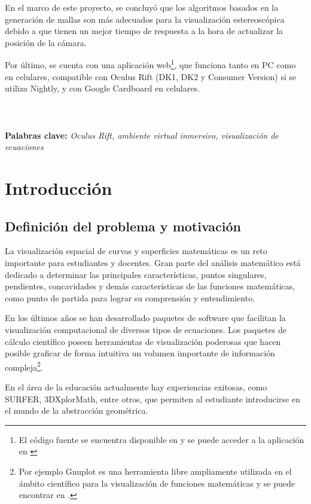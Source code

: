 \documentclass[12pt]{article}
\begin{document}
En el marco de este proyecto, se concluyó que los algoritmos basados en la generación de mallas son más adecuados para la visualización estereoscópica debido a que tienen un mejor tiempo de respuesta a la hora de actualizar la posición de la cámara.

Por último, se cuenta con una aplicación web\footnote{El código fuente se encuentra disponible en \cite{nuestrocodigo} y se puede acceder a la aplicación en \cite{nuestrositio}}, que funciona  tanto en PC como en celulares,  compatible con Oculus Rift (DK1, DK2 y Consumer Version) si se utiliza Nightly, y con Google Cardboard en celulares.
\\
\\
\\
\\
\textbf{Palabras clave:} \textit{Oculus Rift, ambiente virtual inmersivo, visualización de ecuaciones} 


\clearpage
\tableofcontents
\clearpage
\section{Introducción}

\subsection{Definición del problema y motivación}
\noindent La visualización espacial de curvas y superficies matemáticas es un reto importante para estudiantes y docentes. Gran parte del análisis matemático está dedicado a determinar las principales características, puntos singulares, pendientes, concavidades y demás características de las  funciones matemáticas, como punto de partida para lograr su comprensión y entendimiento.

En los últimos años se han desarrollado paquetes de software que facilitan la visualización computacional de diversos tipos de ecuaciones. Los paquetes de cálculo científico poseen herramientas de visualización poderosas que hacen posible graficar de forma intuitiva un volumen importante de información compleja\footnote{Por ejemplo Gnuplot es una herramienta libre ampliamente utilizada en el ámbito científico para la visualización de funciones matemáticas y se puede encontrar en \cite{gnuplot}.}.  

En el área de la educación actualmente hay experiencias exitosas, como SURFER\cite{surfer}, 3DXplorMath\cite{dxplormath}, entre otros, que permiten al estudiante introducirse en el mundo de la abstracción geométrica. 
\end{document}
